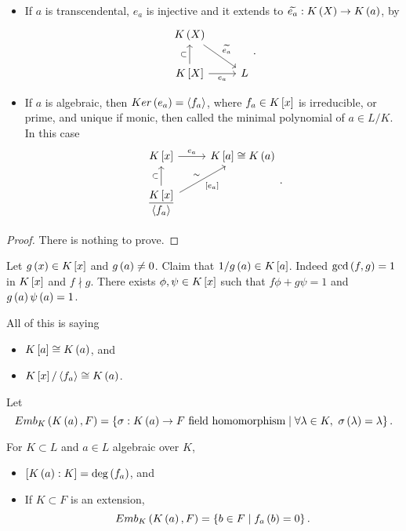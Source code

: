 \begin{lemma}
\hfill
\begin{itemize}
\item If $ a $ is transcendental, $ e_a $ is injective and it extends to $ \widetilde{e_a} : K\rb{X} \to K\rb{a} $, by
$$
\begin{tikzcd}
K\rb{X} \arrow{dr}{\widetilde{e_a}} \\
K\sb{X} \arrow{u}{\subset} \arrow[swap]{r}{e_a} & L
\end{tikzcd}.
$$
\item If $ a $ is algebraic, then $ Ker\rb{e_a} = \ab{f_a} $, where $ f_a \in K\sb{x} $ is irreducible, or prime, and unique if monic, then called the minimal polynomial of $ a \in L / K $. In this case
$$
\begin{tikzcd}
K\sb{x} \arrow{r}{e_a} & K\sb{a} \cong K\rb{a} \\
\dfrac{K\sb{x}}{\ab{f_a}} \arrow{u}{\subset} \arrow{ur}{\sim}[swap]{\sb{e_a}}
\end{tikzcd}.
$$
\end{itemize}
\end{lemma}

\begin{proof}
There is nothing to prove.
\end{proof}

Let $ g\rb{x} \in K\sb{x} $ and $ g\rb{a} \ne 0 $. Claim that $ 1 / g\rb{a} \in K\sb{a} $. Indeed $ \gcd\rb{f, g} = 1 $ in $ K\sb{x} $ and $ f \nmid g $. There exists $ \phi, \psi \in K\sb{x} $ such that $ f\phi + g\psi = 1 $ and $ g\rb{a}\psi\rb{a} = 1 $.

\begin{remark1}
All of this is saying
\begin{itemize}
\item $ K\sb{a} \cong K\rb{a} $, and
\item $ K\sb{x} / \ab{f_a} \cong K\rb{a} $.
\end{itemize}
\end{remark1}

Let
$$ Emb_K\rb{K\rb{a}, F} = \cb{\sigma : K\rb{a} \to F \ \text{field homomorphism} \mid \forall \lambda \in K, \ \sigma\rb{\lambda} = \lambda}. $$

\begin{corollary}
For $ K \subset L $ and $ a \in L $ algebraic over $ K $,
\begin{itemize}
\item $ \sb{K\rb{a} : K} = \deg\rb{f_a} $, and
\item If $ K \subset F $ is an extension,
$$ Emb_K\rb{K\rb{a}, F} = \cb{b \in F \mid f_a\rb{b} = 0}. $$
\end{itemize}
\end{corollary}

